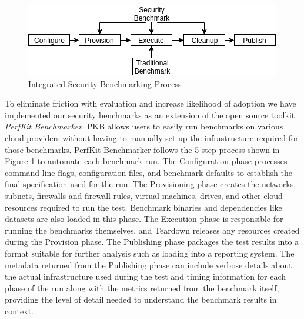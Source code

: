 \begin{figure}[ht]
\centering
\includegraphics[width=.75\textwidth]{resource/img/ch_benchmarking/cloud_benchmarking_methodology.png}
\caption{Integrated Security Benchmarking Process}
\label{fig:benchmarking:boromir_arch}
\end{figure} 

To eliminate friction with evaluation and increase likelihood of adoption we have implemented our security benchmarks as an extension of the open source toolkit \textit{PerfKit Benchmarker}\cite{zaber_pkb}. PKB allows users to easily run benchmarks on various cloud providers without having to manually set up the infrastructure required for those benchmarks. PerfKit Benchmarker follows the 5 step process shown in Figure \ref{fig:benchmarking:boromir_arch} to automate each benchmark run. The Configuration phase processes command line flags, configuration files, and benchmark defaults to establish the final specification used for the run. The Provisioning phase creates the networks, subnets, firewalls and firewall rules, virtual machines, drives, and other cloud resources required to run the test. Benchmark binaries and dependencies like datasets are also loaded in this phase. The Execution phase is responsible for running the benchmarks themselves, and Teardown releases any resources created during the Provision phase. The Publishing phase packages the test results into a format suitable for further analysis such as  loading into a reporting system. The metadata returned from the Publishing phase can include verbose details about the actual infrastructure used during the test and timing information for each phase of the run along with the metrics returned from the benchmark itself, providing the level of detail needed to understand the benchmark results in context. 


